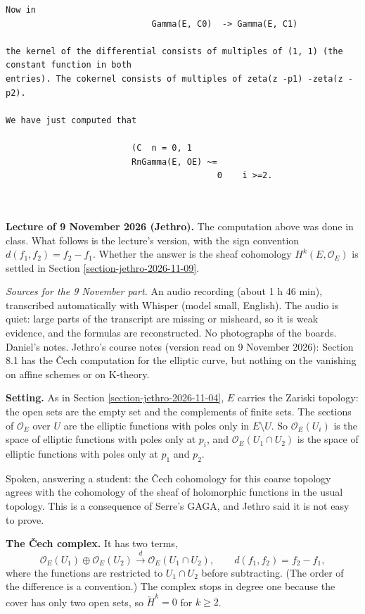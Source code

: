 \begin{Verbatim}[fontsize=\footnotesize]
Now in
                             Gamma(E, C0)  -> Gamma(E, C1)

the kernel of the differential consists of multiples of (1, 1) (the constant function in both
entries). The cokernel consists of multiples of zeta(z -p1) -zeta(z -p2).

We have just computed that

                         (C  n = 0, 1
                         RnGamma(E, OE) ~=
                                          0    i >=2.



\end{Verbatim}

\medskip\noindent
{\bf Lecture of 9 November 2026 (Jethro).}
The computation above was done in class.
What follows is the lecture's version, with
the sign convention $d(f_1,f_2)=f_2-f_1$.
Whether the answer is the sheaf cohomology
$H^k(E,\mathcal{O}_E)$ is settled in Section
\ref{section-jethro-2026-11-09}.

\textit{Sources for the 9 November part.} An
audio recording (about 1 h 46 min),
transcribed automatically with Whisper
(model small, English). The audio is quiet:
large parts of the transcript are missing or
misheard, so it is weak evidence, and the
formulas are reconstructed. No photographs
of the boards. Daniel's notes. Jethro's
course notes
\cite{vanEkerenHomologicalAlgebra2026}
(version read on 9 November 2026): Section
8.1 has the \v{C}ech computation for the
elliptic curve, but nothing on the
vanishing on affine schemes or on
K-theory.

\medskip\noindent
{\bf Setting.} As in Section
\ref{section-jethro-2026-11-04}, $E$ carries
the Zariski topology: the open sets are the
empty set and the complements of finite sets.
The sections of $\mathcal{O}_E$ over $U$ are
the elliptic functions with poles only in
$E\setminus U$. So $\mathcal{O}_E(U_i)$ is
the
space of elliptic functions with poles only
at $p_i$, and $\mathcal{O}_E(U_1\cap U_2)$ is
the space of elliptic functions with poles
only at $p_1$ and $p_2$.

Spoken, answering a student: the \v{C}ech
cohomology for this coarse topology agrees
with the cohomology of the sheaf of
holomorphic functions in the usual topology.
This is a consequence of Serre's GAGA, and
Jethro said it is not easy to prove.

\medskip\noindent
{\bf The \v{C}ech complex.} It has two terms,
$$
\mathcal{O}_E(U_1)\oplus\mathcal{O}_E(U_2)
\xrightarrow{d}
\mathcal{O}_E(U_1\cap U_2),
\qquad
d(f_1,f_2)=f_2-f_1,
$$
where the functions are restricted to
$U_1\cap U_2$ before subtracting. (The order
of the difference is a convention.) The
complex stops in degree one because the
cover has only two open sets, so
$\check{H}^k=0$ for $k\geq 2$.

